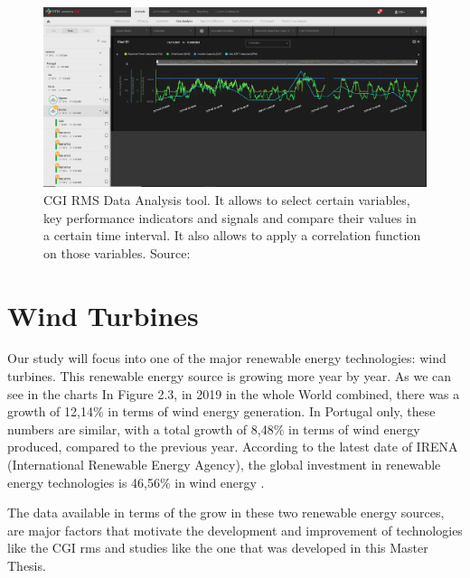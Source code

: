 \begin{figure}[htbp]
	\centering
	\includegraphics[width=\textwidth]{Chapters/Figures/background_fig3.PNG}
	\caption{CGI RMS Data Analysis tool. It allows to select certain variables, key performance indicators and signals and compare their values in a certain time interval. It also allows to apply a correlation function on those variables. Source: \cite{CGIRMS} }
	\label{fig:Figuras_Tree_silhouettes-vectorial}
\end{figure}


\section{Wind Turbines} 
\label{sub:if_you_use_this_template} 

Our study will focus into one of the major renewable energy technologies: wind turbines. This renewable energy source is growing more year by year. As we can see in the charts In Figure 2.3, in 2019 in the whole World combined, there was a growth of 12,14\% in terms of wind energy generation. In Portugal only, these numbers are similar, with a total growth of 8,48\% in terms of wind energy produced, compared to the previous year. According to the latest date of IRENA (International Renewable Energy Agency), the global investment in renewable energy technologies is 46,56\% in wind energy \cite{OLD_33_GENERAL}.

The data available in terms of the grow in these two renewable energy sources, are major factors that motivate the development and improvement of technologies like the CGI \acrshort{rms} and studies like the one that was developed in this Master Thesis.


